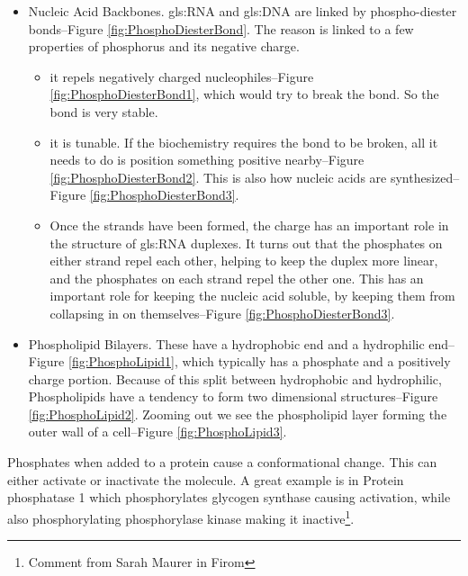 \documentclass[]{article}
\begin{document}
\begin{itemize}
	\item Nucleic Acid Backbones. \gls{gls:RNA} and \gls{gls:DNA} are linked by phospho-diester bonds--Figure \ref{fig:PhosphoDiesterBond}. The reason is linked to a few properties of phosphorus and its negative charge.
	\begin{itemize}
		\item it repels negatively charged nucleophiles--Figure \ref{fig:PhosphoDiesterBond1}, which would try to break the bond. So the bond is very stable.
		\item it is tunable. If the biochemistry requires the bond to be broken, all it needs to do is position something positive nearby--Figure \ref{fig:PhosphoDiesterBond2}. This is also how nucleic acids are synthesized--Figure \ref{fig:PhosphoDiesterBond3}.
		\item Once the strands have been formed, the charge has an important role in the structure of \gls{gls:RNA} duplexes. It turns out that the phosphates on either strand repel each other, helping to keep the duplex more linear, and the phosphates on each strand repel the other one. This has an important role for keeping the nucleic acid soluble, by keeping them from collapsing in on themselves--Figure \ref{fig:PhosphoDiesterBond3}.
	\end{itemize}
	\item Phospholipid Bilayers. These have a hydrophobic end and a hydrophilic end--Figure \ref{fig:PhosphoLipid1}, which typically has a phosphate and a positively charge portion. Because of this split between hydrophobic and hydrophilic, Phospholipids have a tendency to form two dimensional structures--Figure \ref{fig:PhosphoLipid2}. Zooming out we see the phospholipid layer forming the outer wall of a cell--Figure \ref{fig:PhosphoLipid3}.
\end{itemize}


Phosphates when added to a protein cause a conformational change. This can either activate or inactivate the molecule. A great example is in Protein phosphatase 1 which phosphorylates glycogen synthase causing activation, while also phosphorylating phosphorylase kinase making it inactive\footnote{Comment from Sarah Maurer in Firom}.
\end{document}
